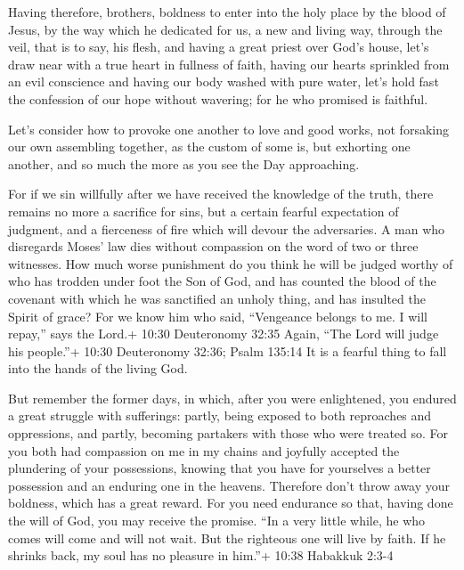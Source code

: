  Having therefore, brothers, boldness to enter into the
holy place by the blood of Jesus,  by the way which he
dedicated for us, a new and living way, through the veil, that is to
say, his flesh,  and having a great priest over God's
house,  let's draw near with a true heart in fullness of
faith, having our hearts sprinkled from an evil conscience and having
our body washed with pure water,  let's hold fast the
confession of our hope without wavering; for he who promised is
faithful.

 Let's consider how to provoke one another to love and good
works,  not forsaking our own assembling together, as the
custom of some is, but exhorting one another, and so much the more as
you see the Day approaching.

 For if we sin willfully after we have received the
knowledge of the truth, there remains no more a sacrifice for sins,
 but a certain fearful expectation of judgment, and a
fierceness of fire which will devour the adversaries.  A
man who disregards Moses' law dies without compassion on the word of two
or three witnesses.  How much worse punishment do you think
he will be judged worthy of who has trodden under foot the Son of God,
and has counted the blood of the covenant with which he was sanctified
an unholy thing, and has insulted the Spirit of grace?  For
we know him who said, ``Vengeance belongs to me. I will repay,'' says
the Lord.+ 10:30 Deuteronomy 32:35 Again, ``The Lord will judge his
people.''+ 10:30 Deuteronomy 32:36; Psalm 135:14  It is a
fearful thing to fall into the hands of the living God.

 But remember the former days, in which, after you were
enlightened, you endured a great struggle with sufferings: 
partly, being exposed to both reproaches and oppressions, and partly,
becoming partakers with those who were treated so.  For you
both had compassion on me in my chains and joyfully accepted the
plundering of your possessions, knowing that you have for yourselves a
better possession and an enduring one in the heavens. 
Therefore don't throw away your boldness, which has a great reward.
 For you need endurance so that, having done the will of
God, you may receive the promise.  ``In a very little
while, he who comes will come and will not wait.  But the
righteous one will live by faith. If he shrinks back, my soul has no
pleasure in him.''+ 10:38 Habakkuk 2:3-4

